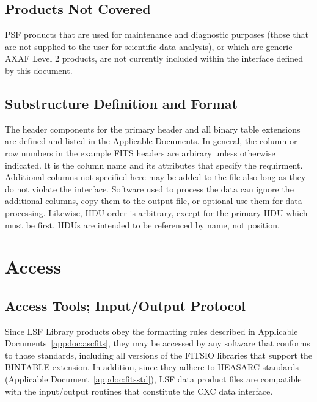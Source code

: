 \documentclass[twoside]{article}
\begin{document}
\subsection{Products Not Covered}

PSF products that are used for maintenance and diagnostic purposes
(those that are not supplied to the user for scientific data
analysis), or which are generic AXAF Level 2 products, are not
currently included within the interface defined by this document.

\subsection{Substructure Definition and Format}

The header components for the primary header and all binary table
extensions are defined and listed in the Applicable Documents. In 
general, the column or row numbers in the example FITS headers 
are arbirary unless otherwise indicated. It is the column name and
its attributes that specify the requirment. Additional columns not
specified here may be added to the file also long as they do not 
violate the interface. Software used to process the data can 
ignore the additional columns, copy them to the output file, or
optional use them for data processing. Likewise, HDU order is 
arbitrary, except for the primary HDU which must be first. HDUs
are intended to be referenced by name, not position. 

\clearpage
\section{Access}
\subsection{Access Tools; Input/Output Protocol}

Since LSF Library products obey the formatting rules described in
Applicable Documents~\ref{appdoc:ascfits},
they may be accessed by any software that conforms to those standards,
including all versions of the FITSIO libraries that support the
BINTABLE extension. In addition, since they adhere to HEASARC
standards (Applicable Document~\ref{appdoc:fitsstd}), LSF data product
files are compatible with the input/output routines that constitute
the CXC data interface.

\end{document}
